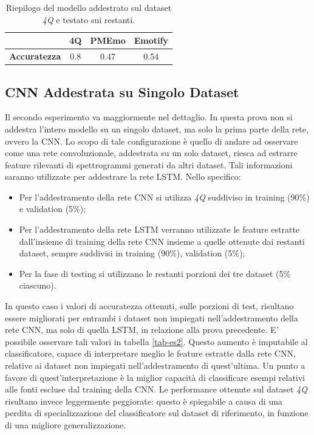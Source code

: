 \documentclass[11pt]{report}
\begin{document}
\newpage

\begin{table}[h]
\caption{Riepilogo del modello addestrato sul dataset \textit{4Q} e testato sui restanti.}
\label{tab-es1}
\centering
\begin{tabular}{|c|c|c|c|}
\hline
&\textbf{4Q} &  \textbf{PMEmo} & \textbf{Emotify}\\
\hline
\textbf{Accuratezza} & 0.8  & 0.47 & 0.54\\
\hline
\end{tabular}
\end{table}






\subsection{CNN Addestrata su Singolo Dataset}

Il secondo esperimento va maggiormente nel dettaglio. In questa prova non si addestra l'intero modello su un singolo dataset, ma solo la prima parte della rete, ovvero la CNN. Lo scopo di tale configurazione è quello di andare ad osservare come una rete convoluzionale, addestrata su un solo dataset, riesca ad estrarre feature rilevanti di spettrogrammi generati da altri dataset. Tali informazioni saranno utilizzate per addestrare la rete LSTM. Nello specifico:
\begin{itemize}
    \item Per l'addestramento della rete CNN si utilizza \textit{4Q} suddiviso in training (90\%) e validation (5\%);
    \item Per l'addestramento della rete LSTM verranno utilizzate le feature estratte dall'insieme di training della rete CNN insieme a quelle ottenute dai restanti dataset, sempre suddivisi in training (90\%), validation (5\%);
    \item Per la fase di testing si utilizzano le restanti porzioni dei tre dataset (5\% ciascuno).
\end{itemize}

In questo caso i valori di accuratezza ottenuti, sulle porzioni di test, risultano essere migliorati per entrambi i dataset non impiegati nell'addestramento della rete CNN, ma solo di quella LSTM, in relazione alla prova precedente. E' possibile osservare tali valori in tabella \ref{tab-es2}. Questo aumento è imputabile al classificatore, capace di interpretare meglio le feature estratte dalla rete CNN, relative ai dataset non impiegati nell'addestramento di quest'ultima. Un punto a favore di quest'interpretazione è la miglior capacità di classificare esempi relativi alle fonti escluse dal training della CNN. Le performance ottenute sul dataset \textit{4Q} risultano invece leggermente peggiorate: questo è spiegabile a causa di una perdita di specializzazione del classificatore sul dataset di riferimento, in funzione di una migliore generalizzazione.
\end{document}
